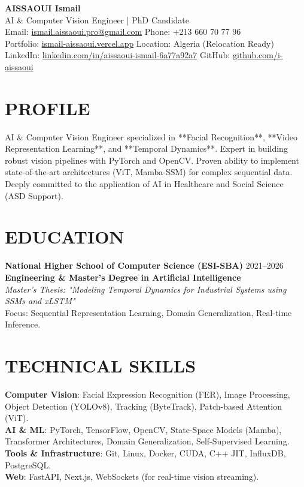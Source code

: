 \documentclass[a4paper,11pt]{article}
\begin{document}
\begin{center}
    {\Huge\bfseries\color{lyon_red} AISSAOUI Ismail}\\[4pt]
    {\Large AI \& Computer Vision Engineer | PhD Candidate}\\[6pt]

    {\normalsize
    Email: \href{mailto:ismail.aissaoui.pro@gmail.com}{ismail.aissaoui.pro@gmail.com} \quad
    Phone: +213 660 70 77 96 \\
    Portfolio: \href{https://ismail-aissaoui.vercel.app}{ismail-aissaoui.vercel.app} \quad
    Location: Algeria (Relocation Ready) \\
    LinkedIn: \href{https://linkedin.com/in/aissaoui-ismail-6a77a92a7}{linkedin.com/in/aissaoui-ismail-6a77a92a7} \quad
    GitHub: \href{https://github.com/i-aissaoui}{github.com/i-aissaoui}
    }
\end{center}

\section{PROFILE}
AI \& Computer Vision Engineer specialized in **Facial Recognition**, **Video Representation Learning**, and **Temporal Dynamics**. Expert in building robust vision pipelines with PyTorch and OpenCV. Proven ability to implement state-of-the-art architectures (ViT, Mamba-SSM) for complex sequential data. Deeply committed to the application of AI in Healthcare and Social Science (ASD Support).

\section{EDUCATION}
\textbf{National Higher School of Computer Science (ESI-SBA)} \hfill 2021--2026 \\
\textbf{Engineering \& Master’s Degree in Artificial Intelligence} \\
\textit{Master's Thesis: "Modeling Temporal Dynamics for Industrial Systems using SSMs and xLSTM"} \\
Focus: Sequential Representation Learning, Domain Generalization, Real-time Inference.

\section{TECHNICAL SKILLS}
\textbf{Computer Vision}: Facial Expression Recognition (FER), Image Processing, Object Detection (YOLOv8), Tracking (ByteTrack), Patch-based Attention (ViT). \\
\textbf{AI \& ML}: PyTorch, TensorFlow, OpenCV, State-Space Models (Mamba), Transformer Architectures, Domain Generalization, Self-Supervised Learning. \\
\textbf{Tools \& Infrastructure}: Git, Linux, Docker, CUDA, C++ JIT, InfluxDB, PostgreSQL. \\
\textbf{Web}: FastAPI, Next.js, WebSockets (for real-time vision streaming).
\end{document}
